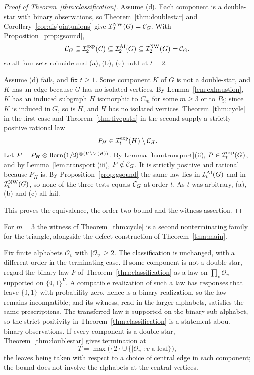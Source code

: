 \begin{proof}[Proof of Theorem~\ref{thm:classification}]
Assume (d). Each component is a double-star with binary observations, so Theorem~\ref{thm:doublestar} and Corollary~\ref{cor:disjointunions} give $\mathcal I^{\mathrm{NW}}_2(G)=\mathcal C_{G}$. With Proposition~\ref{prop:gsound},
\[
\mathcal C_{G}\subseteq\mathcal I^{\mathrm{exp}}_2(G)\subseteq\mathcal I^{\mathrm{AI}}_2(G)\subseteq\mathcal I^{\mathrm{NW}}_2(G)=\mathcal C_{G},
\]
so all four sets coincide and (a), (b), (c) hold at $t=2$.

Assume (d) fails, and fix $t\ge1$. Some component $K$ of $G$ is not a double-star, and $K$ has an edge because $G$ has no isolated vertices. By Lemma~\ref{lem:exhaustion}, $K$ has an induced subgraph $H$ isomorphic to $C_m$ for some $m\ge3$ or to $P_5$; since $K$ is induced in $G$, so is $H$, and $H$ has no isolated vertices. Theorem~\ref{thm:cycle} in the first case and Theorem~\ref{thm:fivepath} in the second supply a strictly positive rational law
\[
P_H\in\mathcal I^{\mathrm{exp}}_t(H)\setminus\mathcal C_{H}.
\]
Let $P=P_H\otimes\operatorname{Bern}(1/2)^{\otimes(V\setminus V(H))}$. By Lemma~\ref{lem:transport}(ii), $P\in\mathcal I^{\mathrm{exp}}_t(G)$, and by Lemma~\ref{lem:transport}(iii), $P\notin\mathcal C_{G}$. It is strictly positive and rational because $P_H$ is. By Proposition~\ref{prop:gsound} the same law lies in $\mathcal I^{\mathrm{AI}}_t(G)$ and in $\mathcal I^{\mathrm{NW}}_t(G)$, so none of the three tests equals $\mathcal C_{G}$ at order $t$. As $t$ was arbitrary, (a), (b) and (c) all fail.

This proves the equivalence, the order-two bound and the witness assertion.
\end{proof}

For $m=3$ the witness of Theorem~\ref{thm:cycle} is a second nonterminating family for the triangle, alongside the defect construction of Theorem~\ref{thm:main}.

\begin{remark}\label{rem:alphabets}
Fix finite alphabets $\mathcal O_v$ with $|\mathcal O_v|\ge2$. The classification is unchanged, with a different order in the terminating case. If some component is not a double-star, regard the binary law $P$ of Theorem~\ref{thm:classification} as a law on $\prod_v\mathcal O_v$ supported on $\{0,1\}^V$. A compatible realization of such a law has responses that leave $\{0,1\}$ with probability zero, hence is a binary realization, so the law remains incompatible; and its witness, read in the larger alphabets, satisfies the same prescriptions. The transferred law is supported on the binary sub-alphabet, so the strict positivity in Theorem~\ref{thm:classification} is a statement about binary observations. If every component is a double-star, Theorem~\ref{thm:doublestar} gives termination at
\[
T=\max\bigl(\{2\}\cup\{|\mathcal O_v|:v\text{ a leaf}\}\bigr),
\]
the leaves being taken with respect to a choice of central edge in each component; the bound does not involve the alphabets at the central vertices.
\end{remark}

